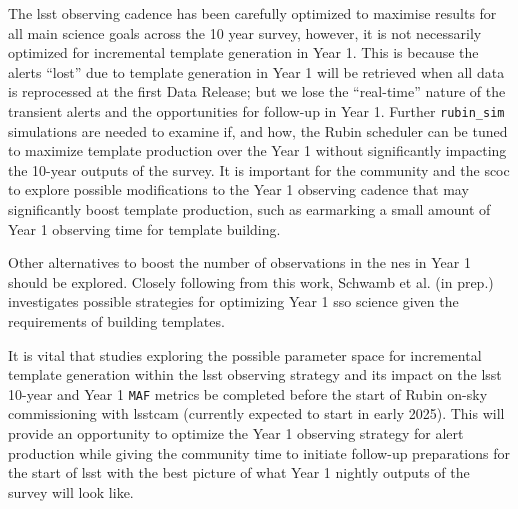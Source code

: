 \documentclass[preprintm,linenumbers]{aastex631}
\newcommand{\rubinsim}{\texttt{rubin\_sim}\xspace}
\newcommand{\maf}{\texttt{MAF}\xspace}
\begin{document}
The \gls*{lsst} observing cadence has been carefully optimized to maximise results for all main science goals across the 10 year survey, however, it is not necessarily optimized for incremental template generation in Year 1.
  This is because the alerts ``lost'' due to template generation in Year 1 will be retrieved when all data is reprocessed at the first Data Release; but we lose the ``real-time'' nature of the transient alerts and the opportunities for follow-up in Year 1.
		Further \rubinsim simulations are needed to examine if, and how, the Rubin scheduler can be tuned to maximize template production over the Year 1 without significantly impacting the 10-year outputs of the survey. 
  It is important for the community and the \gls*{scoc} to explore possible modifications to the Year 1 observing cadence  that may significantly boost template production, such as earmarking a small amount of Year 1 observing time for template building. 

Other alternatives to boost the number of observations in the \gls*{nes} in Year 1 should be explored. 
Closely following from this work, Schwamb et al. (in prep.) investigates possible strategies for optimizing Year 1 \gls*{sso} science given the requirements of building templates.

It is vital that studies exploring the possible parameter space for incremental template generation within the \gls*{lsst} observing strategy and its impact on the \gls*{lsst} 10-year and Year 1 \maf metrics be completed before the start of Rubin on-sky commissioning with \gls*{lsstcam} (currently expected to start in early 2025). 
This will provide an opportunity to optimize the Year 1 observing strategy for alert production while giving the community time to initiate follow-up preparations for the start of \gls*{lsst} with the best picture of what Year 1 nightly outputs of the survey will look like.
		
\end{document}
